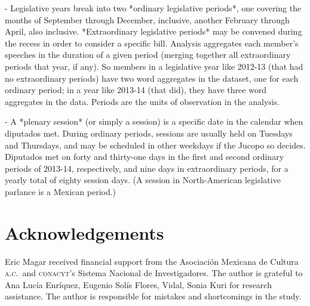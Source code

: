 \documentclass[letter,12pt]{article}
\begin{document}
- Legislative years break into two *ordinary legislative periods*, one covering the months of September through December, inclusive, another February through April, also inclusive. *Extraordinary legislative periods* may be convened during the recess in order to consider a specific bill. Analysis aggregates each member's speeches in the duration of a given period (merging together all extraordinary periods that year, if any). So members in a legislative year like 2012-13 (that had no extraordinary periods) have two word aggregates in the dataset, one for each ordinary period; in a year like 2013-14 (that did), they have three word aggregates in the data. Periods are the units of observation in the analysis. 

- A *plenary session* (or simply a session) is a specific date in the calendar when diputados met. During ordinary periods, sessions are usually held on Tuesdays and Thursdays, and may be scheduled in other weekdays if the Jucopo so decides. Diputados met on forty and thirty-one days in the first and second ordinary periods of 2013-14, respectively, and nine days in extraordinary periods, for a yearly total of eighty session days. (A session in North-American legislative parlance is a Mexican period.)

\newpage

\section*{Acknowledgements}
Eric Magar received financial support from the Asociaci\'on Mexicana de Cultura \textsc{a.c.}\ and \textsc{conacyt}'s Sistema Nacional de Investigadores. The author is grateful to Ana Lucía Enríquez, Eugenio Solís Flores, Vidal, Sonia Kuri for research assistance. The author is responsible for mistakes and shortcomings in the study.









\end{document}
